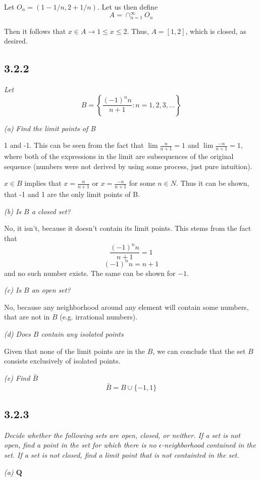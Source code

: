 \documentclass[11pt,oneside,titlepage]{book}
\begin{document}
Let $O_n = (1 - 1/n, 2 + 1/n)$. Let us then define 
$$A = \cap_{n = 1}^{\infty} O_n$$

Then it follows that $x \in A \to 1 \leq x \leq 2$. Thus, $A = [1,2]$, which is
closed, as desired.


\subsection*{3.2.2 }
\textit{Let }
$$B = \left\{\frac{(-1)^nn}{n + 1}: n = 1,2,3,... \right\}$$

\textit{(a) Find the limit points of B}

1 and -1. This can be seen from the fact that $\lim \frac{n}{n + 1} = 1$ and
$\lim \frac{-n}{n + 1} = 1$, where both of the expressions in the limit
are subsequences of the original sequence (numbers were not derived by using
some process, just pure intuition).

$x \in B$ implies that $x = \frac{n}{n + 1}$  or $x = \frac{-n}{n + 1}$ for
some $n \in N$. Thus it can be shown, that -1 and 1 are the only limit points
of B.

\textit{(b) Is $B$ a closed set?}

No, it isn't, because it doesn't contain its limit points. This stems from
the fact that
$$\frac{(-1)^nn}{n + 1} = 1$$
$$(-1)^nn = n + 1$$
and no such number exists. The same can be shown for $-1$.

\textit{(c) Is $B$ an open set?}

No, because any neighborhood around any element will contain some  numbers,
that are not in $B$ (e.g. irrational numbers).

\textit{(d) Does $B$ contain any isolated points}

Given that none of the limit points are in the $B$, we can conclude that
the set $B$ consists exclusively of isolated points.

\textit{(e) Find $\bar{B}$}
$$\bar{B} = B \cup \{-1, 1\}$$

\subsection*{3.2.3}
\textit{Decide whether the following sets are open, closed, or neither. If a
  set is not open, find a point in the set for which there is no
  $\epsilon$-neighborhood contained in the set. If a set is not closed, find
  a limit point that is not containted in the set.  }

\textit{(a) $\textbf{Q}$}
\end{document}
